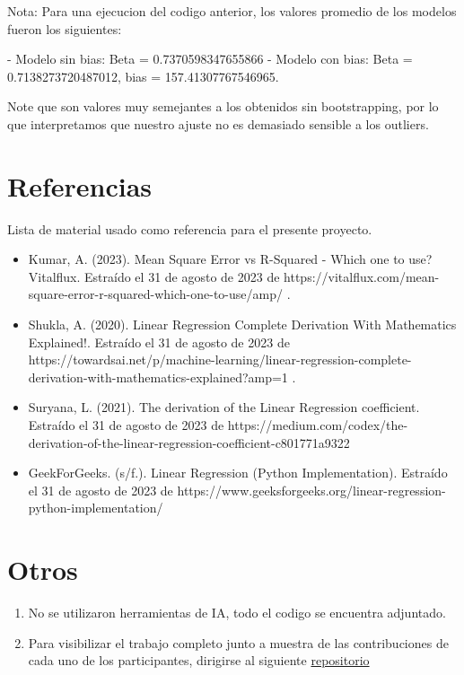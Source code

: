 \documentclass{report}
\begin{document}
    Nota:
    Para una ejecucion del codigo anterior, los valores promedio de los modelos fueron los siguientes:

   - Modelo sin bias: Beta = 0.7370598347655866
   - Modelo con bias: Beta = 0.7138273720487012, bias = 157.41307767546965.

    Note que son valores muy semejantes a los obtenidos sin bootstrapping, por lo que interpretamos que nuestro ajuste no es demasiado sensible a los outliers.

\chapter{Referencias}
    Lista de material usado como referencia para el presente proyecto.
    \begin{itemize}
        \item Kumar, A. (2023). Mean Square Error vs R-Squared - Which one to use? Vitalflux. Estra\'ido el 31 de agosto de 2023 de https://vitalflux.com/mean-square-error-r-squared-which-one-to-use/amp/ .
        \item Shukla, A. (2020). Linear Regression Complete Derivation With Mathematics Explained!. Estra\'ido el 31 de agosto de 2023 de  https://towardsai.net/p/machine-learning/linear-regression-complete-derivation-with-mathematics-explained?amp=1 .
        \item Suryana, L. (2021). The derivation of the Linear Regression coefficient. Estra\'ido el 31 de agosto de 2023 de https://medium.com/codex/the-derivation-of-the-linear-regression-coefficient-c801771a9322
        \item GeekForGeeks. (s/f.). Linear Regression (Python Implementation). Estra\'ido el 31 de agosto de 2023 de https://www.geeksforgeeks.org/linear-regression-python-implementation/
    \end{itemize}

\chapter{Otros}
\begin{enumerate}
    \item No se utilizaron herramientas de IA, todo el codigo se encuentra adjuntado.
    \item Para visibilizar el trabajo completo junto a muestra de las contribuciones de cada uno de los participantes, dirigirse al siguiente \href{https://github.com/ByJuanDiego/linear-regression}{repositorio}
\end{enumerate}
\end{document}
